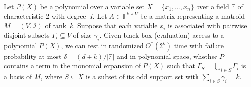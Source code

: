 \documentclass{theoretics}
\newcommand{\F}{\ensuremath{\mathbb F}\xspace}
\newcommand{\cI}{\ensuremath{\mathcal I}\xspace}
\newcommand{\Oh}{O}
\begin{document}
\begin{theorem} \label{theorem:matroid-sieving}
  Let $P(X)$ be a polynomial over a variable set $X = \{ x_1, \dots, x_n \}$ over a field $\F$ of characteristic 2 with degree~$d$.
  Let $A \in \F^{k \times V}$ be a matrix representing a matroid $M=(V, \cI)$ of rank~$k$. 
  Suppose that each variable $x_i$ is associated with pairwise disjoint subsets $\Gamma_i \subseteq V$ of size $\gamma_i$.
  Given black-box (evaluation) access to a polynomial $P(X)$, we can test in randomized $\Oh^*(2^{k})$ time with failure probability at most $\delta = (d + k) / |\F|$ and in polynomial space, whether $P$ contains a term in the monomial expansion of $P(X)$
  such that $\Gamma_S = \bigcup_{i \in S} \Gamma_i$ is a basis of $M$, where $S \subseteq X$ is a subset of its odd support set with $\sum_{i \in S} \gamma_i = k$.
\end{theorem}
\end{document}
